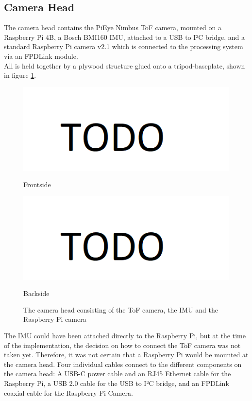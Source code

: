 \subsection{Camera Head}
\label{sec:camHead}
The camera head contains the PiEye Nimbus ToF camera, mounted on a Raspberry Pi 4B, a Bosch BMI160 IMU, attached to a USB to I²C bridge, and a standard Raspberry Pi camera v2.1 which is connected to the processing system via an FPDLink module.\\
All is held together by a plywood structure glued onto a tripod-baseplate, shown in figure \ref{fig:cameraHead}.
\begin{figure}[H]
    \centering
    \begin{minipage}[b]{0.45\textwidth}
      \includegraphics[scale=0.40]{images/todo.png}
      \caption{Frontside}
      \label{fig:cameraHeadfront} 
    \end{minipage} %
    \begin{minipage}[b]{0.45\textwidth}
      \includegraphics[scale=0.40]{images/todo.png} 
      \caption{Backside}
      \label{fig:cameraHeadback} 
    \end{minipage}
    \caption{The camera head consisting of the ToF camera, the IMU and the Raspberry Pi camera}
    \label{fig:cameraHead}
  \end{figure}
The IMU could have been attached directly to the Raspberry Pi, but at the time of the implementation, the decision on how to connect the ToF camera was not taken yet. Therefore, it was not certain that a Raspberry Pi would be mounted at the camera head.
Four individual cables connect to the different components on the camera head: A USB-C power cable and an RJ45 Ethernet cable for the Raspberry Pi, a USB 2.0 cable for the USB to I²C bridge, and an FPDLink coaxial cable for the Raspberry Pi Camera.


